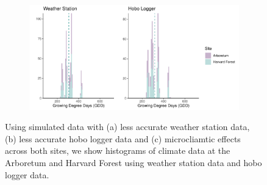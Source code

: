 \documentclass{article}\usepackage[]{graphicx}\usepackage[]{color}
\begin{document}
\begin{figure}
\begin{subfigure}{.32\textwidth}
    \label{fig:gddnoisyhobo}
  \end{subfigure}\\[1ex]
  \begin{subfigure}{.32\textwidth}
	    \caption{}
      \centering
      \includegraphics[width=\linewidth]{..//analyses/figures/gdd_methods_micros.pdf}
      \label{fig:gddmicros}
  \end{subfigure}
\caption{ Using simulated data with (a) less accurate weather station data, (b) less accurate hobo logger data and (c) microcliamtic effects across both sites, we show histograms of climate data at the Arboretum and Harvard Forest using weather station data and hobo logger data.}
\label{fig:climhists}
\end{figure}
\end{document}
